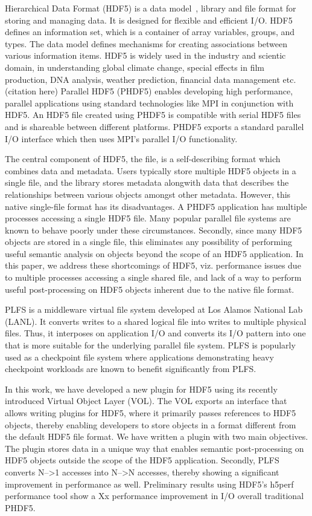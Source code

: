 Hierarchical Data Format (HDF5) is a data model~\cite{hdf5_ad11}, library and file format for storing and managing data. It is designed for flexible and efficient I/O. HDF5 defines an information set, which is a container of array variables, groups, and types. The data model defines mechanisms for creating associations between various information items. HDF5 is widely used in the industry and scientic domain, in understanding global climate change, special effects in film production, DNA analysis, weather prediction, financial data management etc. (citation here)
Parallel HDF5 (PHDF5) enables developing high performance, parallel applications using standard technologies like MPI in conjunction with HDF5. An HDF5 file created using PHDF5 is compatible with serial HDF5 files and is shareable between different platforms. PHDF5 exports a standard parallel I/O interface which then uses MPI's parallel I/O functionality. 

The central component of HDF5, the file, is a self-describing format which combines data and metadata. Users typically store multiple HDF5 objects in a single file, and the library stores metadata alongwith data that describes the relationships between various objects amongst other metadata. 
However, this native single-file format has its disadvantages. A PHDF5 application has multiple processes accessing a single HDF5 file. Many popular parallel file systems are known to behave poorly under these circumstances. Secondly, since many HDF5 objects are stored in a single file, this eliminates any possibility of performing useful semantic analysis on objects beyond the scope of an HDF5 application. In this paper, we address these shortcomings of HDF5, viz. performance issues due to multiple processes accessing a single shared file, and lack of a way to perform useful post-processing on HDF5 objects inherent due to the native file format. 

PLFS is a middleware virtual file system developed at Los Alamos National Lab (LANL). It converts writes to a shared logical file into writes to multiple physical files.  
Thus, it interposes on application I/O and converts its I/O pattern into one that is more suitable for the underlying parallel file system.
PLFS is popularly used as a checkpoint file system where applications demonstrating heavy checkpoint workloads are known to benefit significantly from PLFS.

In this work, we have developed a new plugin for HDF5 using its recently introduced Virtual Object Layer (VOL). The VOL exports an interface that allows writing plugins for HDF5, where it primarily passes references to HDF5 objects, thereby enabling developers to store objects in a format different from the default HDF5 file format. 
We have written a plugin with two main objectives. The plugin stores data in a unique way that enables semantic post-processing on HDF5 objects outside the scope of the HDF5 application. Secondly, PLFS converts N-->1 accesses into N-->N accesses, thereby showing a significant improvement in performance as well. Preliminary results using HDF5's h5perf performance tool show a Xx performance improvement in I/O overall traditional PHDF5.

